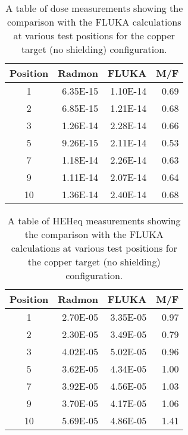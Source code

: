\begin{table}[htbp]
  \centering
    \begin{tabular}{c|r|r|r}
    \textbf{Position} & \textbf{Radmon} & \textbf{FLUKA} & \textbf{M/F} \\
    \hline
    \hline
    1     & 6.35E-15 & 1.10E-14 & 0.69 \\
    2     & 6.85E-15 & 1.21E-14 & 0.68 \\
    3     & 1.26E-14 & 2.28E-14 & 0.66 \\
    5     & 9.26E-15 & 2.11E-14 & 0.53 \\
    7     & 1.18E-14 & 2.26E-14 & 0.63 \\
    9     & 1.11E-14 & 2.07E-14 & 0.64 \\
    10    & 1.36E-14 & 2.40E-14 & 0.68 \\
    \end{tabular}%
    \caption{A table of dose measurements showing the comparison with the FLUKA calculations at various test positions for the copper target (no shielding) configuration.}
  \label{tab:datatable-cpOOOO-dose}%
\end{table}%

\begin{table}[htbp]
  \centering
    \begin{tabular}{c|r|r|r}
    \textbf{Position} & \textbf{Radmon} & \textbf{FLUKA} & \textbf{M/F} \\
    \hline
    \hline
    1     & 2.70E-05 & 3.35E-05 & 0.97 \\
    2     & 2.30E-05 & 3.49E-05 & 0.79 \\
    3     & 4.02E-05 & 5.02E-05 & 0.96 \\
    5     & 3.62E-05 & 4.34E-05 & 1.00 \\
    7     & 3.92E-05 & 4.56E-05 & 1.03 \\
    9     & 3.70E-05 & 4.17E-05 & 1.06 \\
    10    & 5.69E-05 & 4.86E-05 & 1.41 \\
    \end{tabular}%
    \caption{A table of HEHeq measurements showing the comparison with the FLUKA calculations at various test positions for the copper target (no shielding) configuration.}
  \label{tab:datatable-cpOOOO-heheq}%
\end{table}%

